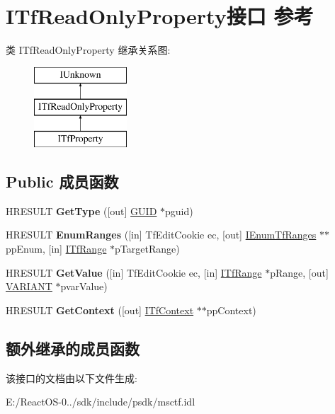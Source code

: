 \hypertarget{interface_i_tf_read_only_property}{}\section{I\+Tf\+Read\+Only\+Property接口 参考}
\label{interface_i_tf_read_only_property}
类 I\+Tf\+Read\+Only\+Property 继承关系图\+:\begin{figure}[H]
\begin{center}
\leavevmode
\includegraphics[height=3.000000cm]{interface_i_tf_read_only_property}
\end{center}
\end{figure}
\subsection*{Public 成员函数}
\begin{DoxyCompactItemize}
\item 
\mbox{\label{interface_i_tf_read_only_property_a40e57891df40575b61a2485b7592b564}} 
H\+R\+E\+S\+U\+LT {\bfseries Get\+Type} (\mbox{[}out\mbox{]} \hyperlink{interface_g_u_i_d}{G\+U\+ID} $\ast$pguid)
\item 
\mbox{\label{interface_i_tf_read_only_property_a584b9edfe6fadaf384ae3b85c7f27e74}} 
H\+R\+E\+S\+U\+LT {\bfseries Enum\+Ranges} (\mbox{[}in\mbox{]} Tf\+Edit\+Cookie ec, \mbox{[}out\mbox{]} \hyperlink{interface_i_enum_tf_ranges}{I\+Enum\+Tf\+Ranges} $\ast$$\ast$pp\+Enum, \mbox{[}in\mbox{]} \hyperlink{interface_i_tf_range}{I\+Tf\+Range} $\ast$p\+Target\+Range)
\item 
\mbox{\label{interface_i_tf_read_only_property_a3cde6b3da65da0fd4e696155e8bb99f6}} 
H\+R\+E\+S\+U\+LT {\bfseries Get\+Value} (\mbox{[}in\mbox{]} Tf\+Edit\+Cookie ec, \mbox{[}in\mbox{]} \hyperlink{interface_i_tf_range}{I\+Tf\+Range} $\ast$p\+Range, \mbox{[}out\mbox{]} \hyperlink{structtag_v_a_r_i_a_n_t}{V\+A\+R\+I\+A\+NT} $\ast$pvar\+Value)
\item 
\mbox{\label{interface_i_tf_read_only_property_adff084138ef0ccdd0da1c23083e1af28}} 
H\+R\+E\+S\+U\+LT {\bfseries Get\+Context} (\mbox{[}out\mbox{]} \hyperlink{interface_i_tf_context}{I\+Tf\+Context} $\ast$$\ast$pp\+Context)
\end{DoxyCompactItemize}
\subsection*{额外继承的成员函数}


该接口的文档由以下文件生成\+:\begin{DoxyCompactItemize}
\item 
E\+:/\+React\+O\+S-\/0../sdk/include/psdk/msctf.\+idl\end{DoxyCompactItemize}

